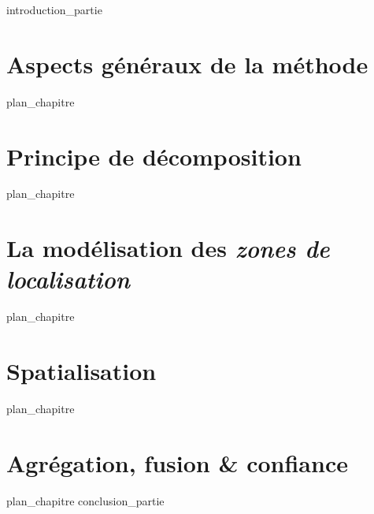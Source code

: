 \label{part:02_int}
{introduction_partie}
%
\chapter{Aspects généraux de la méthode }
\label{chap:04}
{plan_chapitre}
%
\chapter{Principe de décomposition }
\label{chap:05}
{plan_chapitre}
%
\chapter{La modélisation des \emph{zones de localisation}}
\label{chap:06}
{plan_chapitre}
%
\chapter{Spatialisation }
\label{chap:07}
{plan_chapitre}
%
\chapter{Agrégation, fusion \& confiance }
\label{chap:08}
{plan_chapitre}
%
\label{part:02_cnc}
{conclusion_partie}
